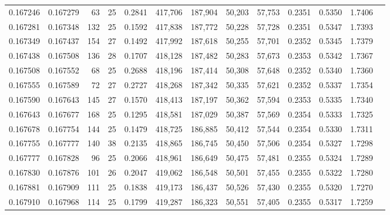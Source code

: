 \begin{tabular}{rrrrrrrrrrrrr}
0.167246 & 0.167279 &  63 &  25 &                                     0.2841 & 417,706 & 187,904 &  50,203 &  57,753 & 0.2351 & 0.5350 & 1.7406 \\
0.167281 & 0.167348 & 132 &  25 &                                     0.1592 & 417,838 & 187,772 &  50,228 &  57,728 & 0.2351 & 0.5347 & 1.7393 \\
0.167349 & 0.167437 & 154 &  27 &                                     0.1492 & 417,992 & 187,618 &  50,255 &  57,701 & 0.2352 & 0.5345 & 1.7379 \\
0.167438 & 0.167508 & 136 &  28 &                                     0.1707 & 418,128 & 187,482 &  50,283 &  57,673 & 0.2353 & 0.5342 & 1.7367 \\
0.167508 & 0.167552 &  68 &  25 &                                     0.2688 & 418,196 & 187,414 &  50,308 &  57,648 & 0.2352 & 0.5340 & 1.7360 \\
0.167555 & 0.167589 &  72 &  27 &                                     0.2727 & 418,268 & 187,342 &  50,335 &  57,621 & 0.2352 & 0.5337 & 1.7354 \\
0.167590 & 0.167643 & 145 &  27 &                                     0.1570 & 418,413 & 187,197 &  50,362 &  57,594 & 0.2353 & 0.5335 & 1.7340 \\
0.167643 & 0.167677 & 168 &  25 &                                     0.1295 & 418,581 & 187,029 &  50,387 &  57,569 & 0.2354 & 0.5333 & 1.7325 \\
0.167678 & 0.167754 & 144 &  25 &                                     0.1479 & 418,725 & 186,885 &  50,412 &  57,544 & 0.2354 & 0.5330 & 1.7311 \\
0.167755 & 0.167777 & 140 &  38 &                                     0.2135 & 418,865 & 186,745 &  50,450 &  57,506 & 0.2354 & 0.5327 & 1.7298 \\
0.167777 & 0.167828 &  96 &  25 &                                     0.2066 & 418,961 & 186,649 &  50,475 &  57,481 & 0.2355 & 0.5324 & 1.7289 \\
0.167830 & 0.167876 & 101 &  26 &                                     0.2047 & 419,062 & 186,548 &  50,501 &  57,455 & 0.2355 & 0.5322 & 1.7280 \\
0.167881 & 0.167909 & 111 &  25 &                                     0.1838 & 419,173 & 186,437 &  50,526 &  57,430 & 0.2355 & 0.5320 & 1.7270 \\
0.167910 & 0.167968 & 114 &  25 &                                     0.1799 & 419,287 & 186,323 &  50,551 &  57,405 & 0.2355 & 0.5317 & 1.7259 \\

\end{tabular}
